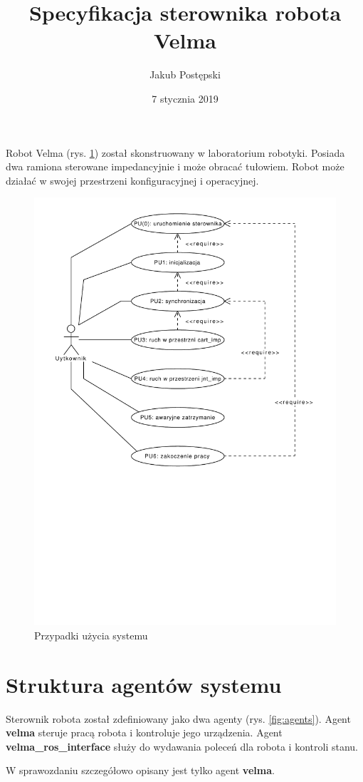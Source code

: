 \documentclass[]{article}
\title{Specyfikacja sterownika robota Velma}
\author{Jakub Postępski}
\date{7 stycznia 2019}
\begin{document}
\maketitle

Robot Velma (rys. \ref{fig:uc}) został skonstruowany w laboratorium robotyki. Posiada dwa ramiona sterowane impedancyjnie i może obracać tułowiem. Robot może działać w swojej przestrzeni konfiguracyjnej i operacyjnej.

\begin{figure}[H]
	\centering
	\includegraphics[width=0.7\linewidth]{velma}
	\caption{Przypadki użycia systemu}
	\label{fig:uc}
\end{figure}

\section{Struktura agentów systemu}
Sterownik robota został zdefiniowany jako dwa agenty (rys. \ref{fig:agents}). Agent \textbf{velma} steruje pracą robota i kontroluje jego urządzenia. Agent \textbf{velma\_ros\_interface} służy do wydawania poleceń dla robota i kontroli stanu.

W sprawozdaniu szczegółowo opisany jest tylko agent \textbf{velma}.
\end{document}
